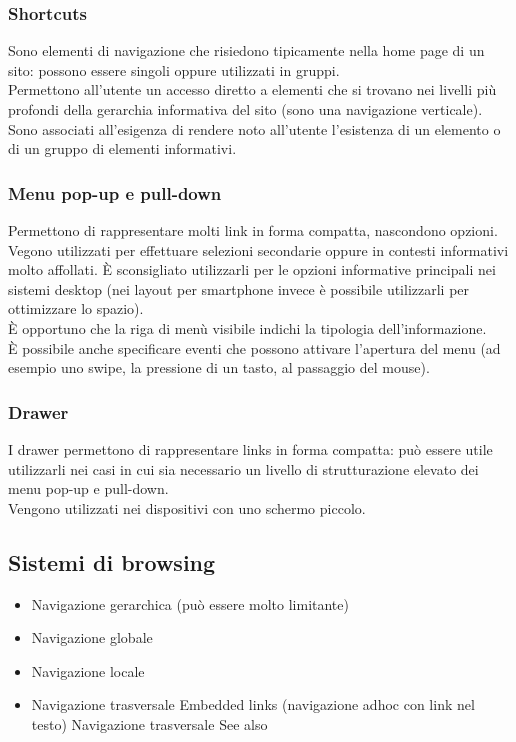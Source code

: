 \documentclass{article}
\begin{document}
\subsubsection{Shortcuts}
Sono elementi di navigazione che risiedono tipicamente nella home page di un sito: possono essere singoli oppure utilizzati in gruppi.\\
Permettono all'utente un accesso diretto a elementi che si trovano nei livelli più profondi della gerarchia informativa del sito (sono una navigazione verticale).\\
Sono associati all'esigenza di rendere noto all'utente l'esistenza di un elemento o di un gruppo di elementi informativi.
\subsubsection{Menu pop-up e pull-down}
Permettono di rappresentare molti link in forma compatta, nascondono opzioni. Vegono utilizzati per effettuare selezioni secondarie oppure in contesti informativi molto affollati. È sconsigliato utilizzarli per le opzioni informative principali nei sistemi desktop (nei layout per smartphone invece è possibile utilizzarli per ottimizzare lo spazio).\\
È opportuno che la riga di menù visibile indichi la tipologia dell'informazione.\\
È possibile anche specificare eventi che possono attivare l'apertura del menu (ad esempio uno swipe, la pressione di un tasto, al passaggio del mouse).
\subsubsection{Drawer}
I drawer permettono di rappresentare links in forma compatta: può essere utile utilizzarli nei casi in cui sia necessario un livello di strutturazione elevato dei menu pop-up e pull-down.\\
Vengono utilizzati nei dispositivi con uno schermo piccolo.
\subsection{Sistemi di browsing}
\begin{itemize}
	\item Navigazione gerarchica (può essere molto limitante)
	\item Navigazione globale
	\item Navigazione locale
	\item Navigazione trasversale
	\subitem Embedded links (navigazione adhoc con link nel testo)
	\subitem Navigazione trasversale
	\subitem See also
\end{itemize}
\end{document}
